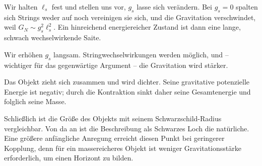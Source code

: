 Wir halten \(\ell_s\) fest und stellen uns vor, \(g_s\) lasse sich verändern. Bei \(g_s=0\) spalten sich Strings weder auf noch vereinigen sie sich, und die Gravitation verschwindet, weil \(G_N\sim g_s^2\ell_s^2\). Ein hinreichend energiereicher Zustand ist dann eine lange, schwach wechselwirkende Saite.

Wir erhöhen \(g_s\) langsam. Stringwechselwirkungen werden möglich, und – wichtiger für das gegenwärtige Argument – die Gravitation wird stärker.

\begin{classroomqa}\end{classroomqa}

Das Objekt zieht sich zusammen und wird dichter. Seine gravitative potenzielle Energie ist negativ; durch die Kontraktion sinkt daher seine Gesamtenergie und folglich seine Masse.

\begin{classroomqa}\end{classroomqa}

Schließlich ist die Größe des Objekts mit seinem Schwarzschild-Radius vergleichbar. Von da an ist die Beschreibung als Schwarzes Loch die natürliche. Eine größere anfängliche Anregung erreicht diesen Punkt bei geringerer Kopplung, denn für ein massereicheres Objekt ist weniger Gravitationsstärke erforderlich, um einen Horizont zu bilden.


